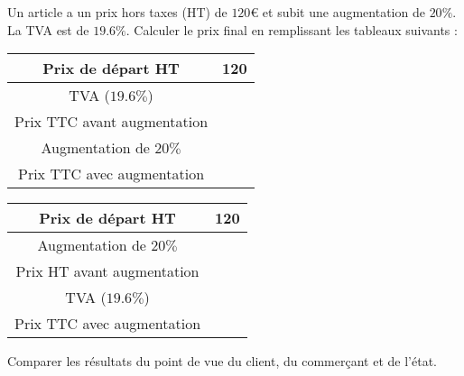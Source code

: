
\begin{exercice}\label{exosmath-0038}

    Un article a un prix hors taxes (HT) de \( 120\)€ et subit une augmentation de \( 20\%\). La TVA est de \( 19.6\%\). Calculer le prix final en remplissant les tableaux suivants :
    \begin{multicols}{2}
        \begin{tabular}[]{|c||c|}
            \hline
            Prix de départ HT&120\\
            \hline\hline
            TVA (\( 19.6\%\))&\\
            \hline
            Prix TTC avant augmentation&\\
            \hline
            Augmentation de \( 20\%\)&\\
            \hline
            Prix TTC avec augmentation&\\
            \hline
        \end{tabular}

    \columnbreak

        \begin{tabular}[]{|c||c|}
            \hline
            Prix de départ HT&120\\
            \hline\hline
            Augmentation de \( 20\%\)&\\
            \hline
            Prix HT avant augmentation&\\
            \hline
            TVA (\( 19.6\%\))&\\
            \hline
            Prix TTC avec augmentation&\\
            \hline
        \end{tabular}
    \end{multicols}

    Comparer les résultats du point de vue du client, du commerçant et de l'état.

\end{exercice}
